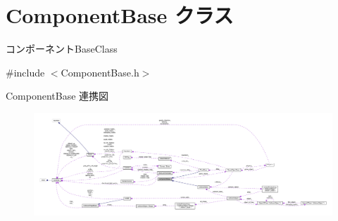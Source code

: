 \hypertarget{class_component_base}{}\section{Component\+Base クラス}
\label{class_component_base}


コンポーネント\+Base\+Class  




{\ttfamily \#include $<$Component\+Base.\+h$>$}



Component\+Base 連携図\nopagebreak
\begin{figure}[H]
\begin{center}
\leavevmode
\includegraphics[width=350pt]{class_component_base__coll__graph}
\end{center}
\end{figure}
